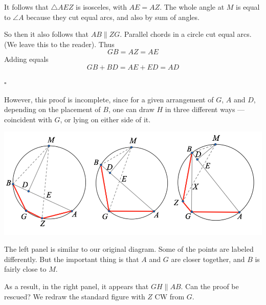\documentclass[11pt, oneside]{article}
\begin{document}
It follows that $\triangle AEZ$ is isosceles, with $AE = AZ$.  The whole angle at $M$ is equal to $\angle A$ because they cut equal arcs, and also by sum of angles.

So then it also follows that $AB \parallel ZG$.  Parallel chords in a circle cut equal arcs.  (We leave this to the reader).  Thus
\[ GB = AZ = AE \]
Adding equals
\[ GB + BD = AE + ED = AD \]

$\square$

However, this proof is incomplete, since for a given arrangement of $G$, $A$ and $D$, depending on the placement of $B$, one can draw $H$ in three different ways --- coincident with $G$, or lying on either side of it.

\begin{center} \includegraphics [scale=0.40] {bc5d.png} \end{center}

The left panel is similar to our original diagram.  Some of the points are labeled differently.  But the important thing is that $A$ and $G$ are closer together, and $B$ is fairly close to $M$.

As a result, in the right panel, it appears that $GH \parallel AB$.  Can the proof be rescued?  We redraw the standard figure with $Z$ CW from $G$.
\end{document}
